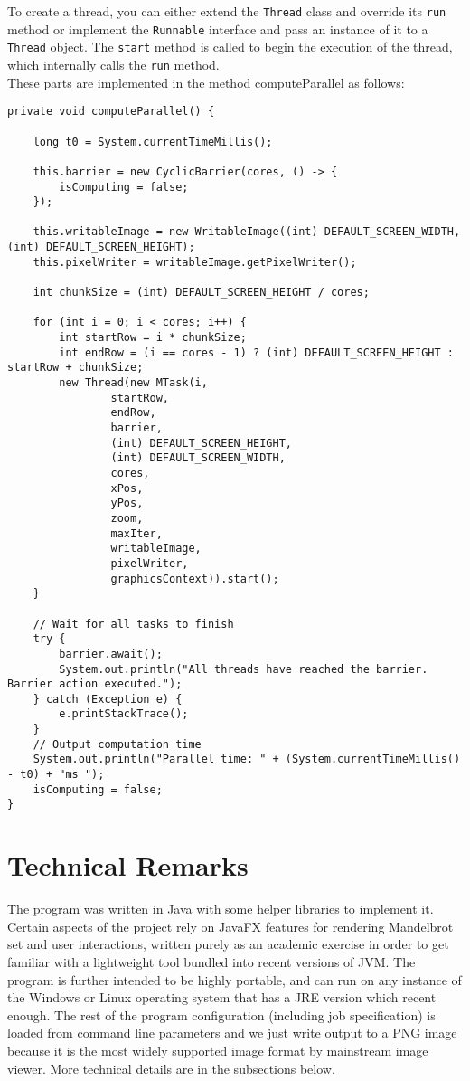 \documentclass[sigconf]{acmart}
\begin{document}
To create a thread, you can either extend the \texttt{Thread} class and override its \texttt{run} method or implement the \texttt{Runnable} interface and pass an instance of it to a \texttt{Thread} object. The \texttt{start} method is called to begin the execution of the thread, which internally calls the \texttt{run} method.
\\
These parts are implemented in the method computeParallel as follows:
\begin{lstlisting}
private void computeParallel() {

    long t0 = System.currentTimeMillis();

    this.barrier = new CyclicBarrier(cores, () -> {
        isComputing = false;
    });

    this.writableImage = new WritableImage((int) DEFAULT_SCREEN_WIDTH, (int) DEFAULT_SCREEN_HEIGHT);
    this.pixelWriter = writableImage.getPixelWriter();

    int chunkSize = (int) DEFAULT_SCREEN_HEIGHT / cores;

    for (int i = 0; i < cores; i++) {
        int startRow = i * chunkSize;
        int endRow = (i == cores - 1) ? (int) DEFAULT_SCREEN_HEIGHT : startRow + chunkSize;
        new Thread(new MTask(i,
                startRow,
                endRow,
                barrier,
                (int) DEFAULT_SCREEN_HEIGHT,
                (int) DEFAULT_SCREEN_WIDTH,
                cores,
                xPos,
                yPos,
                zoom,
                maxIter,
                writableImage,
                pixelWriter,
                graphicsContext)).start();
    }

    // Wait for all tasks to finish
    try {
        barrier.await();
        System.out.println("All threads have reached the barrier. Barrier action executed.");
    } catch (Exception e) {
        e.printStackTrace();
    }
    // Output computation time
    System.out.println("Parallel time: " + (System.currentTimeMillis() - t0) + "ms ");
    isComputing = false;
}
\end{lstlisting}

\section{Technical Remarks}
The program was written in Java with some helper libraries to implement it. Certain aspects of the project rely on JavaFX features for rendering Mandelbrot set and user interactions, written purely as an academic exercise in order to get familiar with a lightweight tool bundled into recent versions of JVM. The program is further intended to be highly portable, and can run on any instance of the Windows or Linux operating system that has a JRE version which recent enough. The rest of the program configuration (including job specification) is loaded from command line parameters and we just write output to a PNG image because it is the most widely supported image format by mainstream image viewer. More technical details are in the subsections below.
\end{document}
